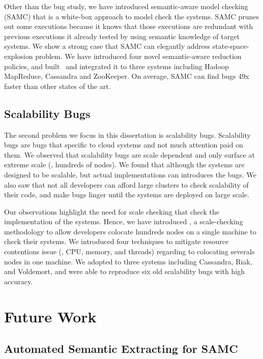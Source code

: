 Other than the bug study, we have introduced semantic-aware model checking
(SAMC) that is a white-box approach to model check the systems. SAMC prunes out
some executions because it knows that those executions are redundant with
previous executions it already tested by using semantic knowledge of target
systems. We show a strong case that SAMC can elegantly address
state-space-explosion problem. We have introduced four novel semantic-aware
reduction policies, and built \sampro\ and integrated it to three systems
including Hadoop MapReduce, Cassandra and ZooKeeper. On average, SAMC can find
bugs 49x faster than other states of the art.

\subsection{Scalability Bugs}

The second problem we focus in this dissertation is scalability bugs.
Scalability bugs are bugs that specific to cloud systems and not much attention
paid on them. We observed that scalability bugs are scale dependent and only
surface at extreme scale (\eg, hundreds of nodes). We found that although the
systems are designed to be scalable, but actual implementations can introduces
the bugs. We also saw that not all developers can afford large clusters to check
scalability of their code, and make bugs linger until the systems are deployed
on large scale.

Our observations highlight the need for scale checking that check the
implementation of the systems. Hence, we have introduced \sck, a scale-checking
methodology to allow developers colocate hundreds nodes on a single machine to
check their systems. We introduced four techniques to mitigate resource
contentions issue (\ie, CPU, memory, and threads) regarding to colocating
severals nodes in one machine. We adopted \sck to three systems including
Cassandra, Riak, and Voldemort, and were able to reproduce six old scalability
bugs with high accuracy.

\section{Future Work}

\subsection{Automated Semantic Extracting for SAMC}
\label{sec-autosamc}

